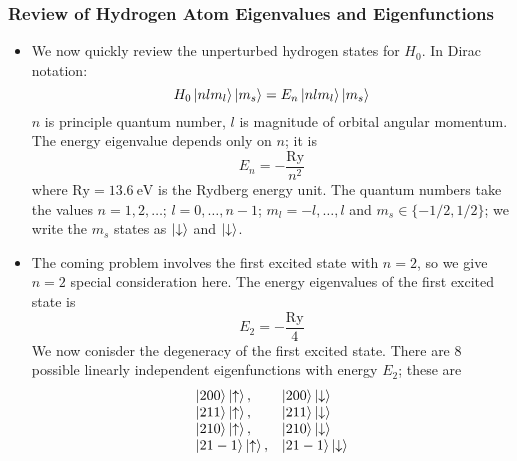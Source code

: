 \documentclass[11pt, a4paper]{article}
\newcommand{\ua}{\uparrow}  %
\newcommand{\da}{\downarrow}  %
\begin{document}
\subsubsection{Review of Hydrogen Atom Eigenvalues and Eigenfunctions}
\begin{itemize}
	\item We now quickly review the unperturbed hydrogen states for $ H_{0} $. In Dirac notation:
	\begin{equation*}
		H_{0}\ket{nlm_{l}}\ket{m_{s}} = E_{n} \ket{nlm_{l}}\ket{m_{s}}
	\end{equation*}
	$ n $ is principle quantum number, $ l $ is magnitude of orbital angular momentum.  The energy eigenvalue depends only on $ n $; it is
	\begin{equation*}
		E_{n} = - \frac{\mathrm{Ry}}{n^{2}}
	\end{equation*}
	where $\mathrm{Ry} = \SI{13.6}{\electronvolt} $ is the Rydberg energy unit. The quantum numbers take the values $ n = 1, 2, \ldots $; $ l = 0, \ldots, n-1 $; $ m_{l} = -l, \ldots, l $ and $ m_{s} \in \{-1/2, 1/2\} $; we write the $ m_{s} $ states as $ \ket{\da} $ and $ \ket{\da} $. 
	
	\item The coming problem involves the first excited state with $ n = 2 $, so we give $ n = 2 $ special consideration here. The energy eigenvalues of the first excited state is
	\begin{equation*}
		E_{2} = - \frac{\mathrm{Ry}}{4}
	\end{equation*}
	We now conisder the degeneracy of the first excited state. There are 8 possible linearly independent eigenfunctions with energy $ E_{2} $; these are
	\[
	\begin{array}{ll}
		\ket{200}\ket{\ua}, & \ket{200}\ket{\da}\\
		\ket{211}\ket{\ua}, & \ket{211}\ket{\da}\\
		\ket{210}\ket{\ua}, & \ket{210}\ket{\da}\\
		\ket{21-1}\ket{\ua}, & \ket{21-1}\ket{\da}
	\end{array}
	\]
	

\end{itemize}
\end{document}
